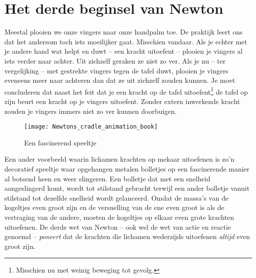\section{Het derde beginsel van Newton}

Meestal plooien we onze vingers naar onze handpalm toe. De praktijk leert ons dat het andersom toch iets moeilijker gaat. Misschien vandaar. Als je echter met je andere hand wat helpt en duwt -- een kracht uitoefent -- plooien je vingers al iets verder naar achter. Uit zichzelf geraken ze niet zo ver. Als je nu -- ter vergelijking -- met gestrekte vingers tegen de tafel duwt, plooien je vingers eveneens meer naar achteren dan dat ze uit zichzelf zouden kunnen. Je moet concluderen dat naast het feit dat je een kracht op de tafel uitoefent\footnote{Misschien nu met weinig beweging tot gevolg.} de tafel op zijn beurt een kracht op je vingers uitoefent. Zonder extern inwerkende kracht zouden je vingers immers niet zo ver kunnen doorbuigen.
\begin{wrapfigure}{R}{0.5\textwidth}
\centering
\texttt{[image: Newtons\_cradle\_animation\_book]}
\caption{Een fascinerend speeltje}
\end{wrapfigure}
Een ander voorbeeld waarin lichamen krachten op mekaar uitoefenen is zo'n decoratief speeltje waar opgehangen metalen bolletjes op een fascinerende manier al botsend heen en weer slingeren. Een bolletje dat met een snelheid aangeslingerd komt, wordt tot stilstand gebracht terwijl een ander bolletje vanuit stilstand tot dezelfde snelheid wordt gelanceerd. Omdat de massa's van de kogeltjes even groot zijn en de versnelling van de ene even groot is als de vertraging van de andere, moeten de kogeltjes op elkaar even grote krachten uitoefenen. De derde wet van Newton -- ook wel de wet van actie en reactie genoemd -- \textit{poneert} dat de krachten die lichamen wederzijds uitoefenen \textit{altijd} even groot zijn.
\newline
{}


